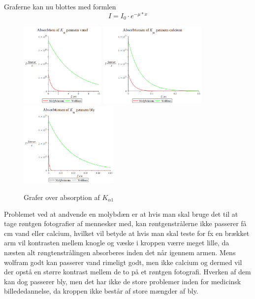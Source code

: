 \documentclass[a4paper,twoside]{article}
\begin{document}
  Graferne kan nu blottes med formlen
  \begin{equation}
      I=I_0\cdot e^{-\mu*x}
  \end{equation}

\begin{figure}[H]
\begin{centering}
\includegraphics[height=4.15cm]{Absorbtion gennem vand.png}
\hspace{0.5cm}
\includegraphics[height=4.15cm]{Absorbtion gennem calcium.png}
\includegraphics[height=4.15cm]{Absorbtion gennem bly.png}
\par\end{centering}
\caption{\label{cap:2ien} Grafer over absorption af $K_{\alpha1}$ }
\end{figure}
Problemet ved at andvende en molybdæn er at hvis man skal bruge det til at tage røntgen fotografier af mennesker med, kan røntgenstrålerne ikke passerer få cm vand eller calcium, hvilket vil betyde at hvis man skal teste for fx en brækket arm vil kontrasten mellem knogle og væske i kroppen værre meget lille, da næsten alt røngtenstrålingen absorberes inden det når igennem armen. Mens wolfram godt kan passerer vand rimeligt godt, men ikke calcium og dermed vil der opstå en større kontrast mellem de to på et røntgen fotografi. Hverken af dem kan dog passerer bly, men det har ikke de store problemer inden for medicinsk billededannelse, da kroppen ikke består af store mængder af bly. 
\end{document}
